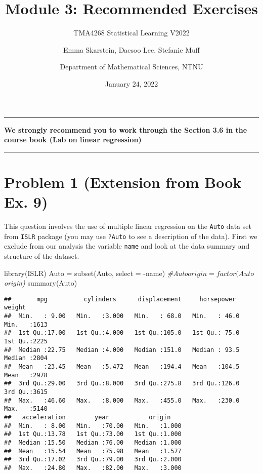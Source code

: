 \documentclass[
]{article}
\title{Module 3: Recommended Exercises}
\subtitle{TMA4268 Statistical Learning V2022}
\author{Emma Skarstein, Daesoo Lee, Stefanie Muff \and Department of
Mathematical Sciences, NTNU}
\date{January 24, 2022}
\newenvironment{Shaded}{\begin{snugshade}}{\end{snugshade}}
\newcommand{\AttributeTok}[1]{\textcolor[rgb]{0.77,0.63,0.00}{#1}}
\newcommand{\CommentTok}[1]{\textcolor[rgb]{0.56,0.35,0.01}{\textit{#1}}}
\newcommand{\FunctionTok}[1]{\textcolor[rgb]{0.00,0.00,0.00}{#1}}
\newcommand{\NormalTok}[1]{#1}
\newcommand{\OtherTok}[1]{\textcolor[rgb]{0.56,0.35,0.01}{#1}}
\newcommand{\SpecialCharTok}[1]{\textcolor[rgb]{0.00,0.00,0.00}{#1}}
\begin{document}
\maketitle

\begin{center}\rule{0.5\linewidth}{0.5pt}\end{center}

\textbf{We strongly recommend you to work through the Section 3.6 in the
course book (Lab on linear regression)}

\begin{center}\rule{0.5\linewidth}{0.5pt}\end{center}

\hypertarget{problem-1-extension-from-book-ex.-9}{%
\section{Problem 1 (Extension from Book Ex.
9)}\label{problem-1-extension-from-book-ex.-9}}

This question involves the use of multiple linear regression on the
\texttt{Auto} data set from \texttt{ISLR} package (you may use
\texttt{?Auto} to see a description of the data). First we exclude from
our analysis the variable \texttt{name} and look at the data summary and
structure of the dataset.

\begin{Shaded}
\begin{Highlighting}[]
\FunctionTok{library}\NormalTok{(ISLR)}
\NormalTok{Auto }\OtherTok{=} \FunctionTok{subset}\NormalTok{(Auto, }\AttributeTok{select =} \SpecialCharTok{{-}}\NormalTok{name)}
\CommentTok{\#Auto$origin = factor(Auto$origin)}
\FunctionTok{summary}\NormalTok{(Auto)}
\end{Highlighting}
\end{Shaded}

\begin{verbatim}
##       mpg          cylinders      displacement     horsepower        weight    
##  Min.   : 9.00   Min.   :3.000   Min.   : 68.0   Min.   : 46.0   Min.   :1613  
##  1st Qu.:17.00   1st Qu.:4.000   1st Qu.:105.0   1st Qu.: 75.0   1st Qu.:2225  
##  Median :22.75   Median :4.000   Median :151.0   Median : 93.5   Median :2804  
##  Mean   :23.45   Mean   :5.472   Mean   :194.4   Mean   :104.5   Mean   :2978  
##  3rd Qu.:29.00   3rd Qu.:8.000   3rd Qu.:275.8   3rd Qu.:126.0   3rd Qu.:3615  
##  Max.   :46.60   Max.   :8.000   Max.   :455.0   Max.   :230.0   Max.   :5140  
##   acceleration        year           origin     
##  Min.   : 8.00   Min.   :70.00   Min.   :1.000  
##  1st Qu.:13.78   1st Qu.:73.00   1st Qu.:1.000  
##  Median :15.50   Median :76.00   Median :1.000  
##  Mean   :15.54   Mean   :75.98   Mean   :1.577  
##  3rd Qu.:17.02   3rd Qu.:79.00   3rd Qu.:2.000  
##  Max.   :24.80   Max.   :82.00   Max.   :3.000
\end{verbatim}
\end{document}
